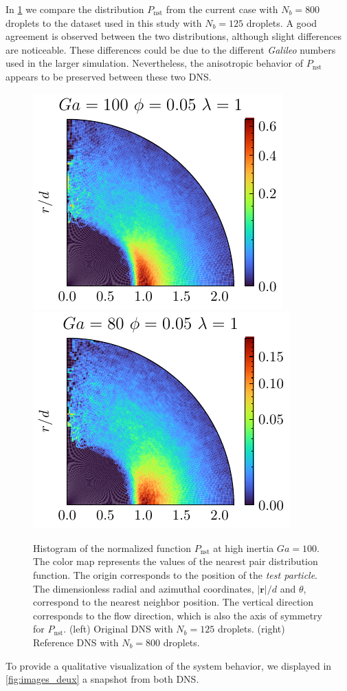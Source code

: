 In \ref{fig:Pnst_large_domain} we compare the distribution $P_\text{nst}$ from the current case with $N_b =800$ droplets to the dataset used in this study with $N_b = 125$ droplets.
A good agreement is observed between the two distributions, although slight differences are noticeable.
These differences could be due to the different \textit{Galileo} numbers used in the larger simulation.
Nevertheless, the anisotropic behavior of $P_\text{nst}$ appears to be preserved between these two DNS.   
\begin{figure}[h!]
    \centering
    \includegraphics[height=0.205\textwidth]{image/HOMOGENEOUS_NEW/Dist/Pnst_l_1_Ga_100_PHI_0_05.pdf}
    \includegraphics[height=0.205\textwidth]{image/HOMOGENEOUS_final/Dist/Pnst_l_1_Ga_80_PHI_0_05.pdf}
    \caption{Histogram of the normalized function $P_\text{nst}$ at high inertia $Ga = 100$.
    The color map represents the values of the nearest pair distribution function. %
    The origin corresponds to the position of the \textit{\textit{test particle}}.
    The dimensionless radial and azimuthal coordinates, $|\textbf{r}|/d$ and $\theta$, correspond to the nearest neighbor position.
    The vertical direction corresponds to the flow direction, which is also the axis of symmetry for $P_\text{nst}$.
    (left) Original DNS with $N_b =125$ droplets.
    (right) Reference DNS with $N_b = 800$ droplets.}
    \label{fig:Pnst_large_domain}
\end{figure}
To provide a qualitative visualization of the system behavior, we displayed in \ref{fig:images_deux} a snapshot from both DNS. 

